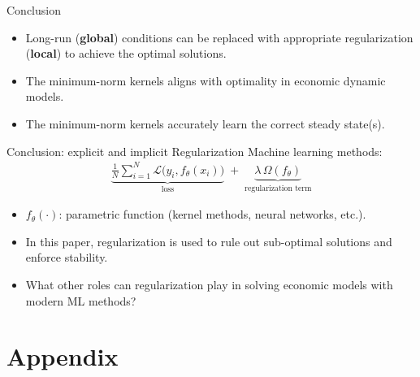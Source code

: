 \documentclass[aspectratio=169,10pt]{beamer}
\newcommand{\emphcolor}[1]{\textbf{\textcolor{emphcolorval}{#1}}}
\begin{document}
\begin{frame}{Conclusion}
	\begin{itemize}
		\item Long-run (\emphcolor{global}) conditions can be replaced with appropriate regularization (\emphcolor{local}) to achieve the optimal solutions.
		\vspace{0.1in}
		\item The minimum-norm kernels aligns with optimality in economic dynamic models.
		\vspace{0.1in}
		\item The minimum-norm kernels accurately learn the correct steady state(s).
		\vspace{0.1in}
	\end{itemize}
\end{frame}
\begin{frame}{Conclusion: explicit and implicit Regularization}
	Machine learning methods:
	\[
	\begin{aligned}
		\underbrace{\frac{1}{N}\sum_{i=1}^N \mathcal{L}\big(y_i,f_\theta(x_i)\big)}_{\text{loss}}
		\;+\;
		\underbrace{\lambda \,\Omega(f_\theta)}_{\text{regularization term}}
	\end{aligned}
	\]
	\begin{itemize}
		\item $f_\theta(\cdot)$: parametric function (kernel methods, neural networks, etc.).
		\item In this paper, regularization is used to rule out sub-optimal solutions and enforce stability.
		\item What other roles can regularization play in solving economic models with modern ML methods?
	\end{itemize}
\end{frame}


\section{Appendix}
\end{document}
